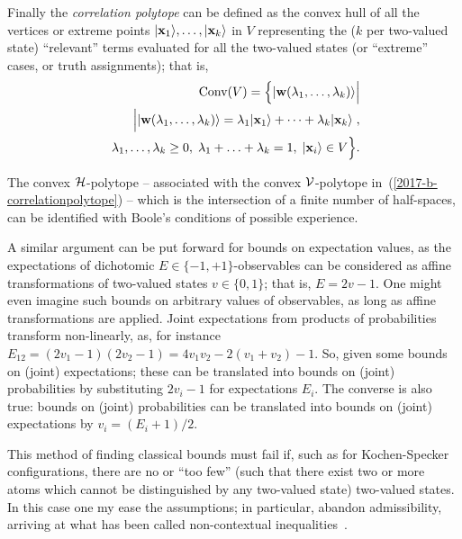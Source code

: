 Finally the {\em correlation polytope} can be defined
as the convex hull of all the vertices or extreme points
$\vert  {\bf x}_1 \rangle , \ldots , \vert  {\bf x}_k \rangle$
in $V$
representing the ($k$ per two-valued state) ``relevant'' terms  evaluated for all the two-valued states
(or ``extreme'' cases, or truth assignments); that is,
\begin{equation}
\begin{split}
\text{Conv}(V) =\Big\{
\vert {\bf w} ( \lambda_1 ,\ldots , \lambda_k ) \rangle
\Big| \\   \Big|
\vert {\bf w} ( \lambda_1 ,\ldots , \lambda_k ) \rangle
=
\lambda_1 \vert  {\bf x}_1 \rangle  + \cdots + \lambda_k \vert  {\bf x}_k \rangle  \;  ,
\\     \;
\lambda_1, \ldots , \lambda_k  \ge 0 ,
\;
\lambda_1 + \ldots + \lambda_k   = 1   ,
\;
\vert  {\bf x}_i \rangle \in V
\Big\}
.
\label{2017-b-correlationpolytope}
\end{split}
\end{equation}

The convex ${\cal H}$-polytope -- associated with the convex ${\cal V}$-polytope in~(\ref{2017-b-correlationpolytope}) --
which is the intersection of a finite number of half-spaces,  can be identified with Boole's conditions of possible
experience.


A similar argument can be put forward for bounds on expectation values, as
the expectations of dichotomic $E   \in \{-1,+1\}$-observables can be considered as affine transformations
of two-valued states $v  \in \{0,1\}$; that is, $E = 2 v - 1$.
One might even imagine such bounds on arbitrary values of observables, as long as affine transformations are applied.
Joint expectations from products of probabilities transform non-linearly, as,
for instance  $E_{12}= (2v_1-1)(2v_2-1)= 4 v_1v_2 - 2(v_1+v_2)-1$.
So, given some bounds on (joint) expectations; these can be translated into bounds on (joint) probabilities
by substituting $2 v_i - 1$ for expectations $E_i$.
The converse is also true:  bounds on (joint) probabilities can be translated into bounds on (joint)
expectations by $v_i = (E_i +1)/2$.

This method of finding classical bounds must fail if,  such as for  Kochen-Specker configurations, there are no or ``too few''
(such that there exist two or more atoms which cannot be distinguished by any two-valued state)
two-valued states.
In this case one my ease the assumptions; in particular, abandon admissibility, arriving at what has been called
non-contextual inequalities~\cite{cabello:210401}.


